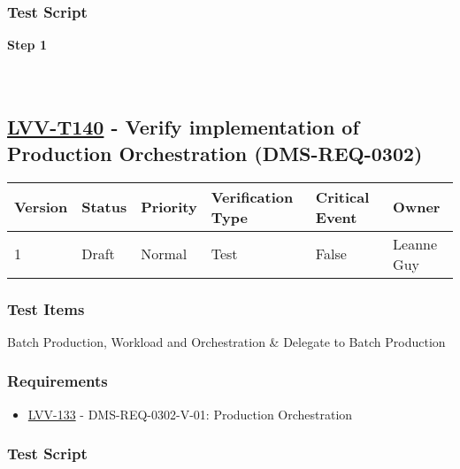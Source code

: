 \hypertarget{test-script-39}{%
\subsubsection{Test Script}\label{test-script-39}}

\textbf{Step 1}\\
~\\
~\\

\hypertarget{lvv-t140---verify-implementation-of-production-orchestration-dms-req-0302}{%
\subsection{\texorpdfstring{\href{https://jira.lsstcorp.org/secure/Tests.jspa\#/testCase/LVV-T140}{LVV-T140}
- Verify implementation of Production Orchestration
(DMS-REQ-0302)}{LVV-T140 - Verify implementation of Production Orchestration (DMS-REQ-0302)}}\label{lvv-t140---verify-implementation-of-production-orchestration-dms-req-0302}}

\begin{longtable}[]{@{}llllll@{}}
\toprule
Version & Status & Priority & Verification Type & Critical Event &
Owner\tabularnewline
\midrule
\endhead
1 & Draft & Normal & Test & False & Leanne Guy\tabularnewline
\bottomrule
\end{longtable}

\hypertarget{test-items-40}{%
\subsubsection{Test Items}\label{test-items-40}}

Batch Production, Workload and Orchestration \& Delegate to Batch
Production

\hypertarget{requirements-40}{%
\subsubsection{Requirements}\label{requirements-40}}

\begin{itemize}
\tightlist
\item
  \href{https://jira.lsstcorp.org/browse/LVV-133}{LVV-133} -
  DMS-REQ-0302-V-01: Production Orchestration
\end{itemize}

\hypertarget{test-script-40}{%
\subsubsection{Test Script}\label{test-script-40}}

